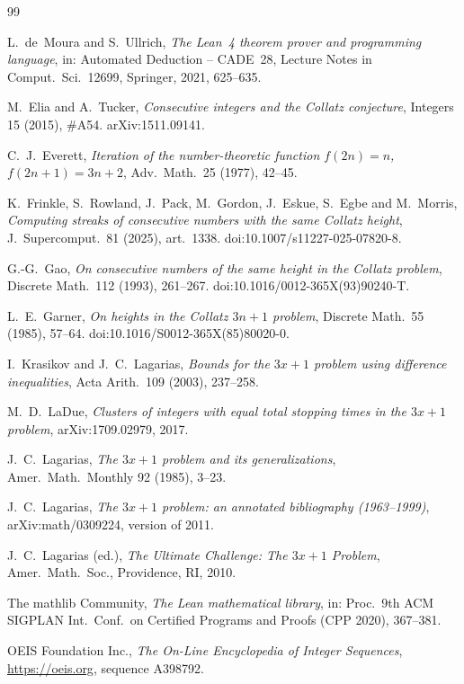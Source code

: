 \documentclass[11pt]{amsart}
\theoremstyle{definition}
\theoremstyle{remark}
\begin{document}
\begin{thebibliography}{99}

 L.~de~Moura and S.~Ullrich, \emph{The Lean~4 theorem prover and programming language}, in: Automated Deduction -- CADE~28, Lecture Notes in Comput.\ Sci.\ 12699, Springer, 2021, 625--635.

 M.~Elia and A.~Tucker, \emph{Consecutive integers and the Collatz conjecture}, Integers 15 (2015), \#A54. arXiv:1511.09141.

 C.~J.~Everett, \emph{Iteration of the number-theoretic function $f(2n)=n$, $f(2n+1)=3n+2$}, Adv.\ Math.\ 25 (1977), 42--45.

 K.~Frinkle, S.~Rowland, J.~Pack, M.~Gordon, J.~Eskue, S.~Egbe and M.~Morris, \emph{Computing streaks of consecutive numbers with the same Collatz height}, J.~Supercomput.\ 81 (2025), art.~1338. doi:10.1007/s11227-025-07820-8.

 G.-G.~Gao, \emph{On consecutive numbers of the same height in the Collatz problem}, Discrete Math.\ 112 (1993), 261--267. doi:10.1016/0012-365X(93)90240-T.

 L.~E.~Garner, \emph{On heights in the Collatz $3n+1$ problem}, Discrete Math.\ 55 (1985), 57--64. doi:10.1016/S0012-365X(85)80020-0.

 I.~Krasikov and J.~C.~Lagarias, \emph{Bounds for the $3x+1$ problem using difference inequalities}, Acta Arith.\ 109 (2003), 237--258.

 M.~D.~LaDue, \emph{Clusters of integers with equal total stopping times in the $3x+1$ problem}, arXiv:1709.02979, 2017.

 J.~C.~Lagarias, \emph{The $3x+1$ problem and its generalizations}, Amer.\ Math.\ Monthly 92 (1985), 3--23.

 J.~C.~Lagarias, \emph{The $3x+1$ problem: an annotated bibliography (1963--1999)}, arXiv:math/0309224, version of 2011.

 J.~C.~Lagarias (ed.), \emph{The Ultimate Challenge: The $3x+1$ Problem}, Amer.\ Math.\ Soc., Providence, RI, 2010.

 The mathlib Community, \emph{The Lean mathematical library}, in: Proc.\ 9th ACM SIGPLAN Int.\ Conf.\ on Certified Programs and Proofs (CPP 2020), 367--381.

 OEIS Foundation Inc., \emph{The On-Line Encyclopedia of Integer Sequences}, \url{https://oeis.org}, sequence A398792.


\end{thebibliography}
\end{document}

